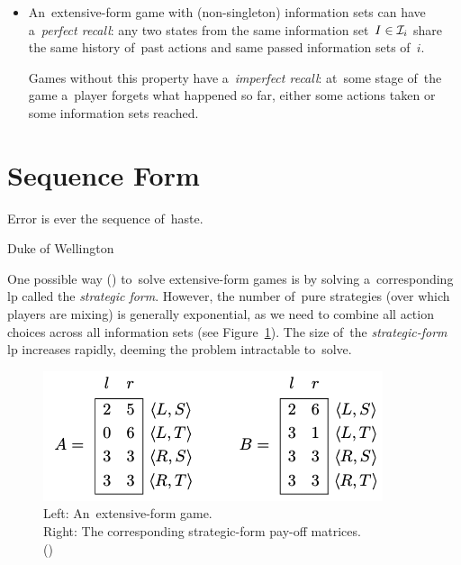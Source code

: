\begin{itemize}
  \item An~extensive-form game with (non-singleton) information sets can have a~\emph{perfect recall}:
    any two states from the same information set~$I \in \mathcal{I} _i$ share the same history of~past actions and same passed information sets of~$i$.

    Games without this property have a~\emph{imperfect recall}:
    at~some stage of~the game a~player forgets what happened so far, either some actions taken or some information sets reached.
\end{itemize}

\section{Sequence Form}
{
  \setlength{\epigraphwidth}{0.65\textwidth}
  \epigraph{
    Error is ever the sequence of~haste.
  }{Duke of Wellington}
}%
One possible way (\cite[pp.~73--74]{AGT07}) to~solve extensive-form games is by solving a~corresponding \acrfull{lp} called the \emph{strategic form}.
However, the number of~pure strategies (over which players are mixing) is generally exponential, as we need to combine all action choices across all information sets (see Figure~\ref{fig:strategic-form}).
The size of~the \emph{strategic-form} \acrshort{lp} increases rapidly, deeming the problem intractable to~solve.
\begin{figure}[H]
  \centering
  \tiny
  \def\svgwidth{.5\textwidth}
  
  \includegraphics[width=.4\textwidth]{../img/strategic-form.png}
  \def\captionTitle{Left: An~extensive-form game. \\Right: The corresponding strategic-form pay-off matrices.}
  \caption[The strategic-form pay-off matrices]{\captionTitle{} \\(\cite[p.~67]{AGT07})}
  \label{fig:strategic-form}
\end{figure}


